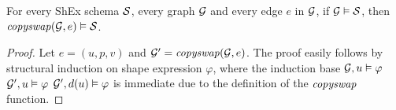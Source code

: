 \begin{lemma}
  For every ShEx schema $\mathcal{S}$, every graph $\mathcal{G}$ and every edge $e$ in $\mathcal{G}$, if $\mathcal{G} \vDash \mathcal{S}$, then
  $\mathit{copyswap}(\mathcal{G}, e) \vDash \mathcal{S}$.
\end{lemma}
%
\begin{proof}
Let $e = (u, p, v)$ and $\mathcal{G}' = \mathit{copyswap}(\mathcal{G}, e)$.
The proof easily follows by structural induction on shape expression
$\varphi$, where the induction base $\mathcal{G}, u \vDash \mathit{\varphi}$ \iff
$\mathcal{G}', u \vDash \mathit{\varphi}$ \iff $\mathcal{G}', d(u) \vDash \mathit{\varphi}$  is
immediate due to the definition of the $\mathit{copyswap}$ function.
\end{proof}
%




